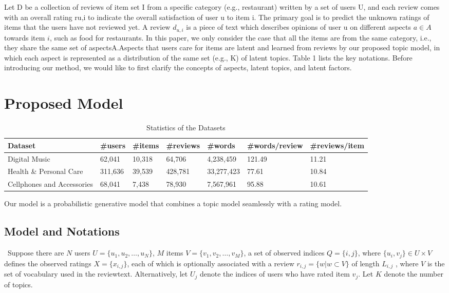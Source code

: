 \documentclass[10pt,conference]{IEEEtran}
\begin{document}
Let D be a collection of reviews of it​em set I from a specific category (e.g., restaurant) written by a set of users ​U, and each review comes with an overall rating ru,i to indicate the overall satisfact​ion of user u to item i. The primary goal is to predict the unknown ratings of items t​hat the users have not reviewed yet. A review $d_{u,i}$ is a piece of text which des​cribes opinions of user u on different aspects $a \in A$ towards item $i$, such as fo​od for restaurants. In this paper, we only consider the case that all the items a​re from the same category, i.e., they share the same set of aspectsA.Aspects that user​s care for items are latent and learned from reviews by our proposed topic model, i​n which each aspect is represented as a distribution of the same set (e.g., K) of la​tent topics. Table 1 lists the key notations. Before introducing our me​thod, we would like to first clarify the concepts of aspects, latent topics, and late​nt factors.

\section{Proposed Model}

\begin{table*}[t]
\centering
\caption{Statistics of the Datasets}
\begin{tabular}{ lllllll }
\toprule
\toprule
Dataset & \#users & \#items & \#reviews & \#words & \#words/review & \#reviews/item \\
\midrule
Digital Music & 62,041 & 10,318 & 64,706 & 4,238,459 & 121.49 & 11.21 \\
Health \& Personal Care & 311,636 & 39,539 & 428,781 & 33,277,423 & 77.61 & 10.84 \\
Cellphones and Accessories & 68,041 & 7,438 & 78,930 & 7,567,961 & 95.88 & 10.61  \\
\bottomrule          
\end{tabular}
\end{table*}

Our model is a probabilistic generative model that combines a topic model seamlessly with a rating model. 

\subsection{Model and Notations}\
Suppose there are $N$ users $U = \{u_1,u_2, \dots ,u_N\}$, $M$ items
$V = \{v_1, v_2, \dots , v_M\}$, a set of observed indices $Q = \{i, j\}$, where $\{u_i, v_j\} \in U \times V$ defines the observed ratings $X = \{x_{i,j}\}$, each of which is optionally associated with a review $r_{i,j} = \{w|w \subset V\}$ of length $L_{i,j}$ , where $V$ is the set of vocabulary used in the reviewtext. Alternatively, let $U_j$ denote the indices of users who have rated item $v_j$. Let $K$ denote the number of topics.
\end{document}
